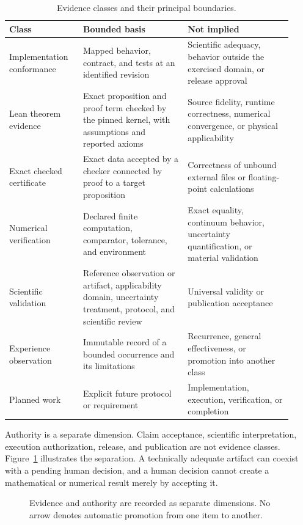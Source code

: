 \documentclass[11pt]{article}
\begin{document}
\begin{table}[htbp]
\centering
\small
\caption{Evidence classes and their principal boundaries.}
\label{tab:evidence}
\begin{tabular}{>{\raggedright\arraybackslash}p{0.24\linewidth}
                >{\raggedright\arraybackslash}p{0.34\linewidth}
                >{\raggedright\arraybackslash}p{0.34\linewidth}}
\toprule
Class & Bounded basis & Not implied \\
\midrule
Implementation conformance & Mapped behavior, contract, and tests at an
identified revision & Scientific adequacy, behavior outside the exercised
domain, or release approval \\
Lean theorem evidence & Exact proposition and proof term checked by the pinned
kernel, with assumptions and reported axioms & Source fidelity, runtime
correctness, numerical convergence, or physical applicability \\
Exact checked certificate & Exact data accepted by a checker connected by proof
to a target proposition & Correctness of unbound external files or
floating-point calculations \\
Numerical verification & Declared finite computation, comparator, tolerance,
and environment & Exact equality, continuum behavior, uncertainty
quantification, or material validation \\
Scientific validation & Reference observation or artifact, applicability
domain, uncertainty treatment, protocol, and scientific review & Universal
validity or publication acceptance \\
Experience observation & Immutable record of a bounded occurrence and its
limitations & Recurrence, general effectiveness, or promotion into another
class \\
Planned work & Explicit future protocol or requirement & Implementation,
execution, verification, or completion \\
\bottomrule
\end{tabular}
\end{table}

Authority is a separate dimension. Claim acceptance, scientific interpretation,
execution authorization, release, and publication are not evidence classes.
Figure~\ref{fig:separation} illustrates the separation. A technically adequate
artifact can coexist with a pending human decision, and a human decision cannot
create a mathematical or numerical result merely by accepting it.

\begin{figure}[htbp]
  \centering
  
  \caption{Evidence and authority are recorded as separate dimensions. No arrow
  denotes automatic promotion from one item to another.}
  \label{fig:separation}
\end{figure}
\end{document}
